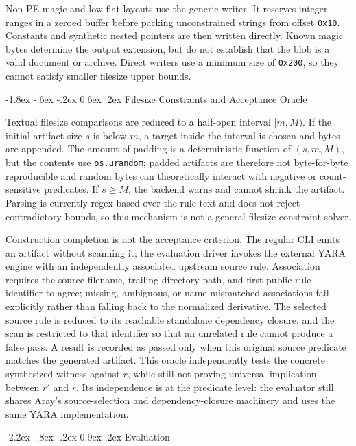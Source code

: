 \documentclass[11pt,twocolumn]{article}
\makeatletter
\newcommand{\code}[1]{\texttt{#1}}
\renewcommand\section{\@startsection{section}{1}{\z@}%
  {-2.2ex \@plus -.8ex \@minus -.2ex}%
  {0.9ex \@plus .2ex}%
  {\normalfont\large\bfseries}}
\renewcommand\subsection{\@startsection{subsection}{2}{\z@}%
  {-1.8ex \@plus -.6ex \@minus -.2ex}%
  {0.6ex \@plus .2ex}%
  {\normalfont\normalsize\bfseries}}
\makeatother
\begin{document}
Non-PE magic and low flat layouts use the generic writer. It reserves integer
ranges in a zeroed buffer before packing unconstrained strings from offset
\code{0x10}. Constants and synthetic nested pointers are then written directly.
Known magic bytes determine the output extension, but do not establish that the
blob is a valid document or archive. Direct writers use a minimum size of
\code{0x200}, so they cannot satisfy smaller filesize upper bounds.

\subsection{Filesize Constraints and Acceptance Oracle}

Textual filesize comparisons are reduced to a half-open interval $[m,M)$.
If the initial artifact size $s$ is below $m$, a target inside the interval is
chosen and bytes are appended. The amount of padding is a deterministic
function of $(s,m,M)$, but the contents use \code{os.urandom}; padded artifacts
are therefore not byte-for-byte reproducible and random bytes can theoretically
interact with negative or count-sensitive predicates. If $s\ge M$, the backend
warns and cannot shrink the artifact. Parsing is currently regex-based over the
rule text and does not reject contradictory bounds, so this mechanism is not a
general filesize constraint solver.

Construction completion is not the acceptance criterion. The regular CLI emits
an artifact without scanning it; the evaluation driver invokes the external YARA
engine with an independently associated upstream source rule. Association
requires the source filename, trailing directory path, and first public rule
identifier to agree; missing, ambiguous, or name-mismatched associations fail
explicitly rather than falling back to the normalized derivative. The selected
source rule is reduced to its reachable standalone dependency closure, and the
scan is restricted to that identifier so that an unrelated rule cannot produce a
false pass. A result is recorded as passed only when this original source
predicate matches the generated artifact. This oracle independently tests the
concrete synthesized witness against $r$, while still not proving universal
implication between $r'$ and $r$. Its independence is at the predicate level:
the evaluator still shares Aray's source-selection and dependency-closure
machinery and uses the same YARA implementation.

\section{Evaluation}
\label{sec:evaluation}
\end{document}
